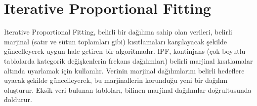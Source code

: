 \section{Iterative Proportional Fitting}

Iterative Proportional Fitting, belirli bir dağılıma sahip olan verileri, belirli marjinal (satır ve sütun toplamları gibi) kısıtlamaları karşılayacak şekilde güncelleyerek uygun hale getiren bir algoritmadır. IPF, kontinjans (çok boyutlu tablolarda kategorik değişkenlerin frekans dağılımları) belirli marjinal kısıtlamalar altında uyarlamak için kullanılır. Verinin marjinal dağılımlarını belirli hedeflere uyacak şekilde güncelleyerek, bu marjinallerin korunduğu yeni bir dağılım oluşturur. Eksik veri bulunan tabloları, bilinen marjinal dağılımlar doğrultusunda doldurur.



\newpage
